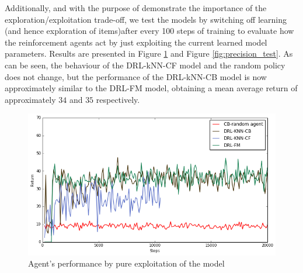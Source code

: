 Additionally, and with the purpose of demonstrate the importance of the exploration/exploitation trade-off, we test the models by switching off learning (and hence exploration of items)after every 100 steps of training to evaluate how the reinforcement agents act by just exploiting the current learned model parameters. Results are presented in Figure \ref{fig:return_test} and Figure \ref{fig:precision_test}. As can be seen, the behaviour of the DRL-kNN-CF model and the random policy does not change, but the performance of the DRL-kNN-CB model is now approximately similar to the DRL-FM model, obtaining a mean average return of approximately $34$ and $35$ respectively.

\begin{figure}[t]
\centering
\includegraphics[scale=0.6]{images/eval_return_test}
\caption{Agent's performance by pure exploitation of the model}
\label{fig:return_test}
\end{figure}
